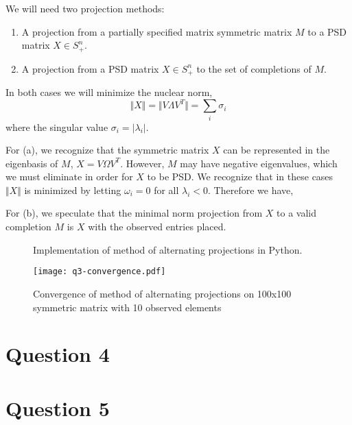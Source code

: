 \documentclass{article}
\begin{document}
We will need two projection methods:

\begin{enumerate}
\item A projection from a partially specified matrix symmetric matrix $M$
  to a PSD matrix $X \in S_+^n$.
\item A projection from a PSD matrix $X \in S_+^n$ to the set of
  completions of $M$.
\end{enumerate}

In both cases we will minimize the nuclear norm,
\[ \Vert X \Vert = \Vert V \Lambda V^T \Vert = \sum_i \sigma_i \]
where the singular value $\sigma_i = \vert \lambda_i \vert$.

For (a), we recognize that the symmetric matrix $X$ can be represented
in the eigenbasis of $M$, $X = V \Omega V^T$. However, $M$ may have
negative eigenvalues, which we must eliminate in order for $X$ to be
PSD. We recognize that in these cases $\Vert X \Vert$ is minimized by
letting $\omega_i = 0$ for all $\lambda_i < 0$. Therefore we have,

For (b), we speculate that the minimal norm projection from $X$ to a
valid completion $M$ is $X$ with the observed entries placed.

\begin{figure}

\caption{Implementation of method of alternating projections in Python.}
\end{figure}

\begin{figure}
  \center
  \texttt{[image: q3-convergence.pdf]}
  \caption{Convergence of method of alternating projections on 100x100
  symmetric matrix with 10 observed elements}
\end{figure}

\section{Question 4}

\section{Question 5}
\end{document}
